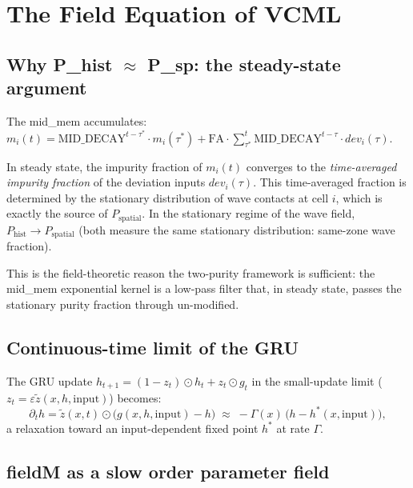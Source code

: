 \documentclass[11pt,a4paper]{article}
\newcommand{\Psp}{P_{\mathrm{spatial}}}
\newcommand{\Phist}{P_{\mathrm{hist}}}
\begin{document}
\section{The Field Equation of VCML}

\subsection{Why P\_hist $\approx$ P\_sp: the steady-state argument}

The mid\_mem accumulates:
$m_i(t) = \mathrm{MID\_DECAY}^{t-\tau^*} \cdot m_i(\tau^*) + \mathrm{FA}
\cdot \sum_{\tau^*}^{t} \mathrm{MID\_DECAY}^{t-\tau} \cdot dev_i(\tau)$.

In steady state, the impurity fraction of $m_i(t)$ converges to the
\emph{time-averaged impurity fraction} of the deviation inputs $dev_i(\tau)$.
This time-averaged fraction is determined by the stationary distribution of
wave contacts at cell $i$, which is exactly the source of $\Psp$.
In the stationary regime of the wave field, $\Phist \to \Psp$
(both measure the same stationary distribution: same-zone wave fraction).

This is the field-theoretic reason the two-purity framework is sufficient:
the mid\_mem exponential kernel is a low-pass filter that, in steady state,
passes the stationary purity fraction through un-modified.

\subsection{Continuous-time limit of the GRU}

The GRU update $h_{t+1} = (1-z_t)\odot h_t + z_t \odot g_t$ in the small-update
limit ($z_t = \varepsilon \tilde{z}(x,h,\mathrm{input})$) becomes:
\begin{equation}
  \partial_t h = \tilde{z}(x,t)\odot\bigl(g(x,h,\mathrm{input}) - h\bigr)
  \;\approx\; -\Gamma(x)\,\bigl(h - h^*(x,\mathrm{input})\bigr),
\end{equation}
a relaxation toward an input-dependent fixed point $h^*$ at rate $\Gamma$.

\subsection{fieldM as a slow order parameter field}
\end{document}
